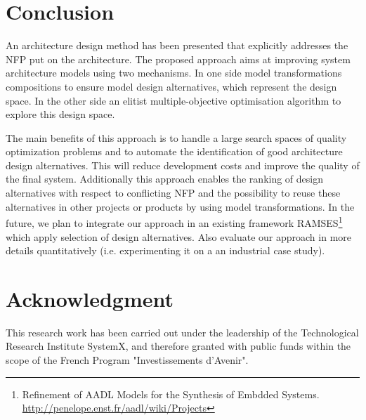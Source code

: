 \documentclass[conference]{IEEEtran}
\begin{document}
\section{Conclusion}
\label{Conclu}
An architecture design method has been presented that explicitly addresses the NFP put on the architecture. The proposed approach aims at improving system architecture models using two mechanisms. In one side model transformations compositions to ensure model design alternatives, which represent the design space. In the other side an elitist multiple-objective optimisation algorithm to explore this design space.

The main benefits of this approach is to handle a large search spaces of quality optimization problems and to automate the identification of good architecture design alternatives. This will reduce development costs and improve the quality of the final system. Additionally this approach enables the ranking of design alternatives with respect to conflicting NFP and the possibility to reuse these alternatives in other projects or products by using model transformations.
In the future, we plan to integrate our approach in an existing framework RAMSES\footnote{Refinement of AADL Models for the Synthesis of Embdded Systems. \url{http://penelope.enst.fr/aadl/wiki/Projects}} which apply selection of design alternatives. Also evaluate our approach in more details quantitatively (i.e. experimenting it on a an industrial case study).



\section{Acknowledgment}
This research work has been carried out under the leadership of the Technological Research Institute SystemX, and therefore granted with public funds within the scope of the French Program "Investissements d’Avenir".
\end{document}
